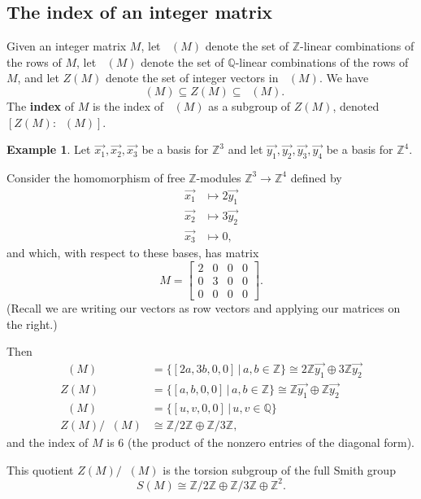 \documentclass[11pt]{article}
\theoremstyle{definition}
\newtheorem{example}[theo]{Example}
\numberwithin{equation}{section}
\numberwithin{equation}{section}
\newcommand{\Z}[0]{\mathbb{Z}}
\newcommand{\Q}[0]{\mathbb{Q}}
\DeclareMathOperator{\rowz}{row_{\mathbb{Z}}}
\DeclareMathOperator{\rowq}{row_{\mathbb{Q}}}
\begin{document}
\subsection{The index of an integer matrix}

Given an integer matrix $M$, let $\rowz(M)$ denote the set of $\Z$-linear combinations of the rows of $M$, let $\rowq(M)$ denote the set of $\Q$-linear combinations of the rows of $M$, and let $Z(M)$ denote the set of integer vectors in $\rowq(M)$.  We have
\[
\rowz(M) \subseteq Z(M) \subseteq \rowq(M).
\]
The {\bf index} of $M$ is the index of $\rowz(M)$ as a subgroup of $Z(M)$, denoted $[Z(M) : \rowz(M)]$.  

\begin{example}
    Let $\vec{x_{1}}, \vec{x_{2}}, \vec{x_{3}}$ be a basis for $\Z^{3}$ and let $\vec{y_{1}}, \vec{y_{2}},\vec{y_{3}},\vec{y_{4}}$ be a basis for $\Z^{4}$.  
    
    Consider the homomorphism of free $\Z$-modules $\Z^{3} \to \Z^{4}$ defined by
    \begin{align*}
    \vec{x_{1}} &\mapsto 2\vec{y_{1}}\\
    \vec{x_{2}} &\mapsto 3\vec{y_{2}}\\
    \vec{x_{3}} &\mapsto 0,
    \end{align*}
    and which, with respect to these bases, has matrix
    \[M =
    \begin{bmatrix}
        2 & 0 & 0 & 0\\
        0 & 3 & 0 & 0\\
        0 & 0 & 0 & 0
    \end{bmatrix}.
    \]
    (Recall we are writing our vectors as row vectors and applying our matrices on the right.)

    Then 
    \begin{align*}
        \rowz(M) &= \{[2a,3b,0,0] \, \vert \, a,b \in \Z\} \cong 2\Z \vec{y_{1}} \oplus 3\Z \vec{y_{2}}\\
        Z(M) &= \{[a,b,0,0] \, \vert \, a,b \in \Z\} \cong \Z \vec{y_{1}} \oplus \Z \vec{y_{2}}\\
        \rowq(M) &= \{[u,v,0,0] \, \vert \, u,v \in \Q\}\\
        Z(M) / \rowz(M) &\cong \Z/2\Z \oplus \Z/3\Z,
    \end{align*}
    and the index of $M$ is $6$ (the product of the nonzero entries of the diagonal form).
   
    This quotient $Z(M) / \rowz(M)$ is the torsion subgroup of the full Smith group 
    \[
    S(M) \cong \Z/2\Z \oplus \Z/3\Z \oplus \Z^{2}.
    \]   
\end{example}
\end{document}
